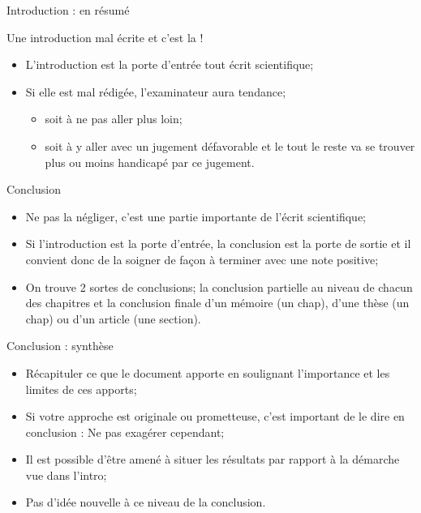 \documentclass[french]{beamer}
\newcommand\red[1]{{\color{ulred}{\textbf{#1}}}}
\begin{document}
\begin{frame}{Introduction : en résumé}

Une introduction mal écrite et c'est la \red{fin} !
\begin{itemize}
	\item L'introduction est la porte d'entrée tout écrit scientifique;
	\item Si elle est mal rédigée, l'examinateur aura tendance;
	\begin{itemize}
		\item soit à ne pas aller plus loin;
		\item soit à y aller avec un jugement défavorable et le tout le reste va se trouver plus ou moins handicapé par ce jugement.
	\end{itemize}
\end{itemize}
\end{frame}

\begin{frame}{Conclusion}
\begin{itemize}
	\item Ne pas la négliger, c'est une partie importante de l'écrit scientifique;
	\item Si l'introduction est la porte d'entrée, la conclusion est la porte de sortie et il convient donc de la soigner de façon à terminer avec une note positive;
	\item On trouve 2 sortes de conclusions; la conclusion partielle au niveau de chacun des chapitres et la conclusion finale d'un mémoire (un chap), d'une thèse (un chap) ou d'un article (une section).
\end{itemize}
\end{frame}

\begin{frame}{Conclusion : synthèse}
	\begin{itemize}
	\item Récapituler ce que le document apporte en soulignant l'importance et les limites de ces apports;
	\item Si votre approche est originale ou prometteuse, c'est important de le dire en conclusion : Ne pas exagérer cependant;
	\item Il est possible d'être amené à situer les résultats par rapport à la démarche vue dans l'intro;
	\item Pas d'idée nouvelle à ce niveau de la conclusion.
	\end{itemize}
\end{frame}
\end{document}
